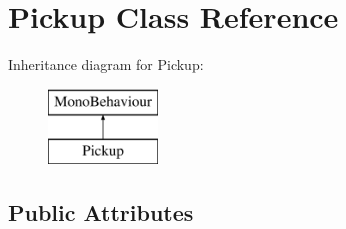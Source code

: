 \hypertarget{class_pickup}{}\section{Pickup Class Reference}
\label{class_pickup}
Inheritance diagram for Pickup\+:\begin{figure}[H]
\begin{center}
\leavevmode
\includegraphics[height=2.000000cm]{class_pickup}
\end{center}
\end{figure}
\subsection*{Public Attributes}
